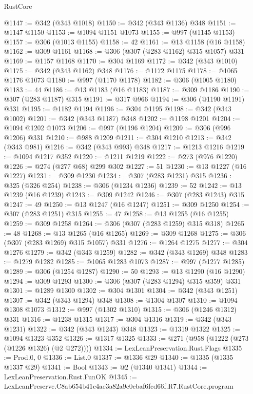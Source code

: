 \begin{lexlean}{RustCore}
\begin{coremodule}
@1147 := @342 (@343 @1018)
@1150 := @342 (@343 @1136) @348
@1151 := @1147 @1150
@1153 := @1094 @1151 @1073
@1155 := @997 (@1145 @1153)
@1157 := @306 (@1013 @1155)
@1158 := 42
@1161 := @13 @1158 (@16 @1158)
@1162 := @309 @1161
@1168 := @306 (@307 (@283 @1162) @315 @1057) @331
@1169 := @1157 @1168
@1170 := @304 @1169
@1172 := @342 (@343 @1010)
@1175 := @342 (@343 @1162) @348
@1176 := @1172 @1175
@1178 := @1065 @1176 @1073
@1180 := @997 (@1170 @1178)
@1182 := @306 (@1005 @1180)
@1183 := 44
@1186 := @13 @1183 (@16 @1183)
@1187 := @309 @1186
@1190 := @307 (@283 @1187) @315
@1191 := @317 @966
@1194 := @306 (@1190 @1191) @331
@1195 := @1182 @1194
@1196 := @304 @1195
@1198 := @342 (@343 @1002)
@1201 := @342 (@343 @1187) @348
@1202 := @1198 @1201
@1204 := @1094 @1202 @1073
@1206 := @997 (@1196 @1204)
@1209 := @306 (@996 @1206) @331
@1210 := @988 @1209
@1211 := @304 @1210
@1213 := @342 (@343 @981)
@1216 := @342 (@343 @993) @348
@1217 := @1213 @1216
@1219 := @1094 @1217 @352
@1220 := @1211 @1219
@1222 := @273 (@976 @1220)
@1226 := @274 (@277 @68) @299 @302
@1227 := 51
@1230 := @13 @1227 (@16 @1227)
@1231 := @309 @1230
@1234 := @307 (@283 @1231) @315
@1236 := @325 (@326 @254)
@1238 := @306 (@1234 @1236)
@1239 := 52
@1242 := @13 @1239 (@16 @1239)
@1243 := @309 @1242
@1246 := @307 (@283 @1243) @315
@1247 := 49
@1250 := @13 @1247 (@16 @1247)
@1251 := @309 @1250
@1254 := @307 (@283 @1251) @315
@1255 := 47
@1258 := @13 @1255 (@16 @1255)
@1259 := @309 @1258
@1264 := @306 (@307 (@283 @1259) @315 @318)
@1265 := 48
@1268 := @13 @1265 (@16 @1265)
@1269 := @309 @1268
@1275 := @306 (@307 (@283 @1269) @315 @1057) @331
@1276 := @1264 @1275
@1277 := @304 @1276
@1279 := @342 (@343 @1259)
@1282 := @342 (@343 @1269) @348
@1283 := @1279 @1282
@1285 := @1065 @1283 @1073
@1287 := @997 (@1277 @1285)
@1289 := @306 (@1254 @1287)
@1290 := 50
@1293 := @13 @1290 (@16 @1290)
@1294 := @309 @1293
@1300 := @306 (@307 (@283 @1294) @315 @359) @331
@1301 := @1289 @1300
@1302 := @304 @1301
@1304 := @342 (@343 @1251)
@1307 := @342 (@343 @1294) @348
@1308 := @1304 @1307
@1310 := @1094 @1308 @1073
@1312 := @997 (@1302 @1310)
@1315 := @306 (@1246 @1312) @331
@1316 := @1238 @1315
@1317 := @304 @1316
@1319 := @342 (@343 @1231)
@1322 := @342 (@343 @1243) @348
@1323 := @1319 @1322
@1325 := @1094 @1323 @352
@1326 := @1317 @1325
@1333 := @271 (@958 (@1222 (@273 (@1226 @1326) (@2 @272))))
@1334 := LexLeanPreservation.Rust.Flags
@1335 := Prod.{0, 0}
@1336 := List.{0}
@1337 := @1336 @29
@1340 := @1335 (@1335 @1337 @29)
@1341 := Bool
@1343 := @2 (@1340 @1341)
@1344 := LexLeanPreservation.Rust.FunOK
@1345 := LexLeanPreserve.C8ab654b41c4ae3a82a9c0ebaf6fcd66f.R7.RustCore.program

\end{coremodule}
\end{lexlean}
